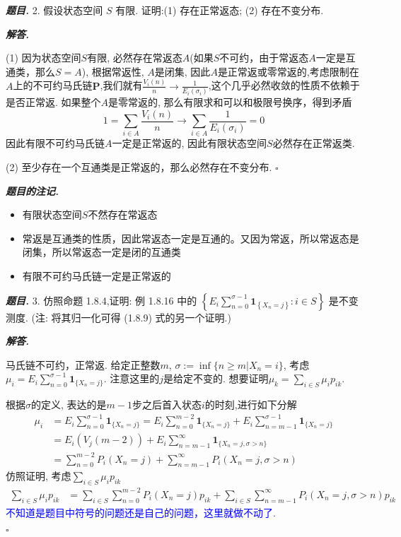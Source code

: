 \documentclass[10pt, a4paper, oneside]{ctexart}
\newenvironment{problem}{\begin{framed}\par\noindent\textbf{\textit{题目. }}}{\end{framed}\par}
\newenvironment{solution}{%
  \par\noindent\textbf{\textit{解答. }}\ignorespaces
}{%
  \hfill\ensuremath{\square}\par %
}
\newenvironment{note}{\par\noindent\textbf{\textit{题目的注记. }}\ignorespaces}{\par}
\begin{document}
\begin{problem}
    2. 假设状态空间 \( S \) 有限. 证明:(1) 存在正常返态; (2) 存在不变分布.
\end{problem}
\begin{solution}
    (1) 因为状态空间$S$有限, 必然存在常返态$A$(如果$S$不可约，由于常返态$A$一定是互通类，那么$S=A$), 根据常返性, $A$是闭集, 因此$A$是正常返或零常返的,考虑限制在$A$上的不可约马氏链$\hat{\mathbf{P}}$,我们就有$\frac{V_i(n)}{n}\to \frac{1}{E_i(\sigma_i)}$,这个几乎必然收敛的性质不依赖于是否正常返. 如果整个$A$是零常返的, 那么有限求和可以和极限号换序，得到矛盾
    $$1=\sum_{i\in A}\frac{V_i(n)}{n}\to \sum_{i\in A}\frac{1}{E_i(\sigma_i)}=0$$
    因此有限不可约马氏链$A$一定是正常返的, 因此有限状态空间$S$必然存在正常返类.

    (2) 至少存在一个互通类是正常返的，那么必然存在不变分布.
\end{solution}
\begin{note}
    \begin{itemize}
        \item 有限状态空间$S$不然存在常返态
        \item 常返是互通类的性质，因此常返态一定是互通的。又因为常返，所以常返态是闭集，所以常返态一定是闭的互通类
        \item 有限不可约马氏链一定是正常返的
    \end{itemize}
\end{note}

\begin{problem}
    3. 仿照命题 1.8.4,证明: 例 1.8.16 中的 \( \left\{  {{E}_{i}\mathop{\sum }\limits_{{n = 0}}^{{\sigma  - 1}}{\mathbf{1}}_{\left\{  {X}_{n} = j\right\}  } : i \in  S}\right\}   \)
是不变测度. (注: 将其归一化可得 (1.8.9) 式的另一个证明.)
\end{problem}

\begin{solution}
    马氏链不可约，正常返. 给定正整数$m$, $\sigma:=\inf\{n\geq m| X_n=i \}$, 考虑$\mu_i=E_i\sum_{n=0}^{\sigma - 1}\mathbf{1}_{\{X_n=j\}}$. 注意这里的$j$是给定不变的. 想要证明$\mu_k=\sum_{i\in S}\mu_ip_{ik}$.

    根据$\sigma$的定义, 表达的是$m-1$步之后首入状态$i$的时刻,进行如下分解
    \begin{align*}
        \mu_i&=E_i\sum_{n=0}^{\sigma - 1}\mathbf{1}_{\{X_n=j\}}=E_i\sum_{n=0}^{m-2}\mathbf{1}_{\{X_n=j\}}+E_i\sum_{n=m-1}^{\sigma - 1}\mathbf{1}_{\{X_n=j\}}\\
        &=E_i(V_j(m-2))+E_i \sum_{n=m-1}^{\infty} \mathbf{1}_{\{X_n=j,\sigma>n\}}\\
        &=\sum_{n=0}^{m-2}P_i(X_n=j)+\sum_{n=m-1}^{\infty}P_i(X_n=j,\sigma>n)
    \end{align*}
    仿照证明, 考虑$\sum_{i\in S}\mu_i p_{ik}$
    \begin{align*}
        \sum_{i\in S}\mu_i p_{ik}&=\sum_{i\in S}\sum_{n=0}^{m-2}P_i(X_n=j)p_{ik}+\sum_{i\in S}\sum_{n=m-1}^{\infty}P_i(X_n=j,\sigma>n)p_{ik}
    \end{align*}
    \textcolor{blue}{不知道是题目中符号的问题还是自己的问题，这里就做不动了.}
    
\end{solution}
\end{document}
